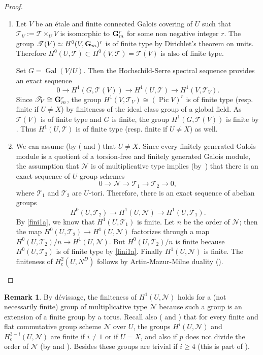 \documentclass[11pt]{article}
\newcommand{\resp}{resp.\xspace}
\newcommand{\skpt}{\smallskip}
\let\mathcal\mathscr
\newenvironment{enumeratea}
{\bgroup\def\theenumi{\alph{enumi}}\begin{enumerate}}
{\end{enumerate}\egroup}
\newcommand{\rc}{\mathrm{c}}
\theoremstyle{plain}
\theoremstyle{definition}
\newtheorem{rema}[theo]{Remark}
\DeclareMathOperator \pic {Pic}
\DeclareMathOperator \gal {Gal}
\newcommand\cN {\mathcal{N}}
\newcommand \cT {\mathcal{T}}
\begin{document}
\skpt\begin{proof}
\begin{enumeratea}
\item
Let $V$ be an étale and finite connected
Galois covering of $U$ such that $\cT_V:=\cT \times_U V$
is isomorphic to $\mathbf{G}_m^r$ for some non negative integer $r$.
The group $\cT(V) \simeq
H^0(V,\G)^r$ is of finite type by Dirichlet's theorem on units. Therefore
$H^0(U,\cT) \subset H^0(V,\cT)=\cT(V)$
is also of finite type.

Set $G=\gal(V/U)$. Then the Hochschild-Serre spectral sequence provides an
exact sequence
\[
0 \to H^1(G,\cT(V)) \to H^1(U,\cT)
\to H^1(V,\cT_V).
\]
Since $\cT_V \cong \G^r$, the group
$H^1(V,\cT_V) \cong (\pic V)^r$ is of finite type
(\resp finite if $U \neq X$) by finiteness of the ideal class group
of a global field.
As $\cT(V)$ is of finite type and $G$ is finite, the group
$H^1(G,\cT(V))$ is finite by \cite[Chap.\,VIII, Cor.\,2]{col}.
Thus $H^1(U,\cT)$ is of
finite type (\resp finite if $U \neq X$) as well.

\item
We can assume (by (\cite[Lem.\,III.8.9]{MilADT}
and \cite[Cor.\,4.9]{DemH}) that $U \neq X$.
Since every finitely generated Galois module is a quotient of a
torsion-free and finitely generated Galois module, the
assumption that $\cN$ is of multiplicative type implies
(by~\cite[X, Prop.\,1.1]{sga3})
that there is an exact sequence of $U$-group schemes
\[
0 \to \cN \to \cT_1 \to \cT_2 \to 0,
\]
where $\cT_1$ and $\cT_2$ are $U$-tori. Therefore, there is
an exact sequence of abelian groups
\[
H^0(U,\cT_2) \to H^1(U, \cN) \to H^1(U, \cT_1).
\]
By \eqref{fini1a}, we know that $H^1(U, \cT_1)$ is finite. Let $n$ be the order
of $\cN$; then the map $H^0(U,\cT_2) \to H^1(U, \cN)$
factorizes through a map $H^0(U,\cT_2)/n \to H^1(U, \cN)$.
But $H^0(U,\cT_2)/n$ is finite because $H^0(U,\cT_2)$
is of finite type by \eqref{fini1a}. Finally $H^1(U, \cN)$ is finite. The
finiteness of $H^2_\rc(U,N^D)$ follows by Artin-Mazur-Milne
duality (\cite[Th.\,1.1]{DemH}).\qedhere
\end{enumeratea}
\end{proof}

\begin{rema} \label{fini2}
By dévissage, the finiteness of $H^1(U, \cN)$ holds for
a (not necessarily finite)
group of multiplicative type $\cN$
because such a group is an extension of
a finite group by a torus. Recall also (\cite[Lem.\,III.8.9]{MilADT}
and \cite[Cor.\,4.8]{DemH})
that for every finite and flat commutative
group scheme $\cN$ over $U$, the groups $H^i(U,\cN)$ and
$H^{3-i}_\rc(U,\cN)$ are finite if $i \neq 1$ or if $U=X$, and
also if $p$ does not divide the order of $\cN$ (by \cite[Prop.\,2.1\,(4)]{DemH} and \cite[Th.\,II.3.1]{MilADT}).
Besides these groups are trivial if $i \geq 4$ (this is part of \cite[Th.\,1.1]{DemH}).
\end{rema}
\end{document}
